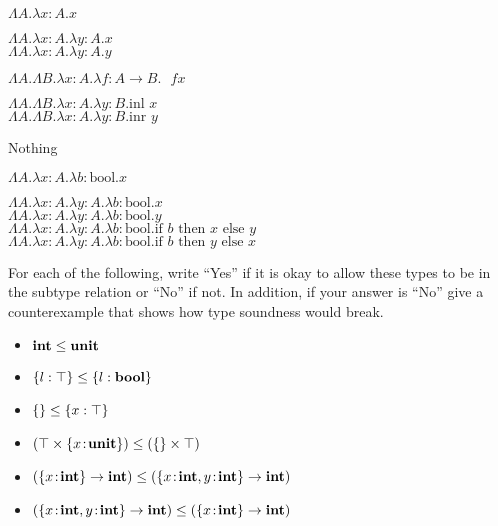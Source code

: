 \documentclass[10pt]{article}
\begin{document}
\begin{exercise}
\begin{enumerate}
\begin{minipage}{.5\textwidth}
\item  $\Lambda A. \lambda x:A. x$   \\
\item $\Lambda A. \lambda x:A. \lambda y:A. x$\\
$\Lambda A. \lambda x:A. \lambda y:A. y$
\item $\Lambda A. \Lambda B. \lambda x:A. \lambda f:A \rightarrow B. \text{ } f x$ \\
\item $\Lambda A. \Lambda B. \lambda x:A. \lambda y:B. \text{inl } x$\\
$\Lambda A. \Lambda B. \lambda x:A. \lambda y:B. \text{inr } y$
\end{minipage}\begin{minipage}{.5\textwidth}
\item Nothing\\
\item $\Lambda A. \lambda x:A. \lambda b:\text{bool}. x $\\
\item  $\Lambda A. \lambda x:A. \lambda y:A. \lambda b:\text{bool}. x $\\
$\Lambda A. \lambda x:A. \lambda y:A. \lambda b:\text{bool}. y $\\
$\Lambda A. \lambda x:A. \lambda y:A. \lambda b:\text{bool}. \text{if } b \text{ then } x \text{ else } y $\\
$\Lambda A. \lambda x:A. \lambda y:A. \lambda b:\text{bool}. \text{if } b \text{ then } y \text{ else } x$\\
\bigskip\bigskip
\end{minipage}
\end{enumerate}
\end{exercise}

\begin{exercise}
  For each of the following, write ``Yes'' if it is okay to allow
  these types to be in the subtype relation or ``No'' if not. In
  addition, if your answer is ``No'' give a counterexample that shows
  how type soundness would break.
\begin{itemize}
\item $\mathsf{\textbf{int}} \leq \mathsf{\textbf{unit}}$
\item $\{ l : \top \} \leq \{ l : \mathsf{\textbf{bool}} \}$
\item $\{ \} \leq \{ x : \top \}$ 
\item $(\top \times \{ x \!:\! \mathsf{\textbf{unit}} \}) \leq (\{\} \times \top)$
\item $(\{ x \!:\! \mathsf{\textbf{int}} \} \rightarrow \mathsf{\textbf{int}}) \leq (\{ x \!:\! \mathsf{\textbf{int}}, y \!:\! \mathsf{\textbf{int}} \} \rightarrow \mathsf{\textbf{int}})$
\item $(\{ x \!:\! \mathsf{\textbf{int}}, y \!:\! \mathsf{\textbf{int}} \} \rightarrow \mathsf{\textbf{int}}) \leq (\{ x \!:\! \mathsf{\textbf{int}} \} \rightarrow \mathsf{\textbf{int}})$
\end{itemize}
\end{exercise}
\end{document}
